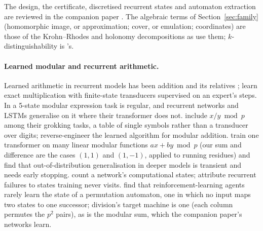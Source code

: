 \documentclass[11pt]{article}
\begin{document}
The design, the certificate, discretised recurrent states and automaton extraction are reviewed in
the companion paper \citep{barkhuizen-2026-snapped-window-recurrence}. The algebraic terms of
Section~\ref{sec:family} (homomorphic image, or approximation; cover, or emulation; coordinates) are
those of the Krohn--Rhodes and holonomy decompositions as
\citet{egri-nagy-2015-computational-holonomy-decomposition,egri-nagy-2024-covering-lemma-transformation-semigroups}
use them; $k$-distinguishability is \citet{chow-1978-testing-software-design-finite-state-machines}'s.

\paragraph{Learned modular and recurrent arithmetic.} Learned arithmetic in recurrent models has been
addition and its relatives
\citep{kaiser-2015-neural-gpu,price-2016-neural-gpu-extensions-limitations,mohri-2026-rational-transductors};
\citet{papazov-2025-exact-learning-arithmetic-differentiable-agents} learn exact multiplication with
finite-state transducers supervised on an expert's steps. In
\citet{deletang-2022-neural-networks-chomsky-hierarchy} a 5-state modular expression task is regular,
and recurrent networks and LSTMs generalise on it where their transformer does not.
\citet{power-2022-grokking-small-algorithmic-datasets} include $x / y \bmod p$ among their grokking
tasks, a table of single symbols rather than a transducer over digits;
\citet{nanda-2023-progress-measures-grokking} reverse-engineer the learned algorithm for modular
addition. \citet{he-2024-learning-to-grok-modular-arithmetic} train one transformer on many linear
modular functions $a x + b y \bmod p$ (our sum and difference are the cases $(1, 1)$ and $(1, -1)$,
applied to running residues) and find that out-of-distribution generalisation in deeper models is
transient and needs early stopping. \citet{robinson-2020-extrapolating-algorithmic-learning} count a
network's computational states; \citet{buitrago-2025-length-generalization-recurrent-models}
attribute recurrent failures to states training never visits.
\citet{allchin-2026-reward-teach-state-hidden-automaton} find that reinforcement-learning agents
rarely learn the state of a permutation automaton, one in which no input maps two states to one
successor; division's target machine is one (each column permutes the $p^2$ pairs), as is the
modular sum, which the companion paper's networks learn.
\end{document}
